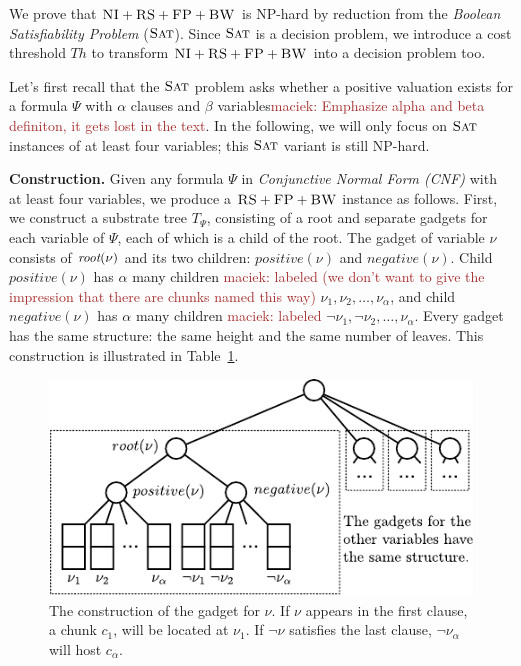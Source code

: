\documentclass[9pt]{sigcomm-alternate}
\newcommand{\maciek}[1]{\textcolor{brown}{maciek: #1}}
\newcommand{\variab}{\nu}
\newcommand{\aroot}{\emph{root}}
\newcommand{\clauses}{\alpha}
\newcommand{\variables}{\beta}
\newcommand{\achunk}{\ensuremath{c}}
\newcommand{\CC}{\textsc{NI}}
\newcommand{\FP}{\textsc{FP}}
\newcommand{\RS}{\textsc{RS}}
\newcommand{\BW}{\textsc{BW}}
\newcommand{\Tree}{\ensuremath{T}}
\newcommand{\SAT}{\textsc{Sat}}
\newcommand{\Formula}{\ensuremath{\Psi}}
\newcommand{\Thr}{\ensuremath{Th}}
\newcommand{\positive}{\ensuremath{positive}}
\newcommand{\negative}{\ensuremath{negative}}
\begin{document}
\begin{appendix}

We prove that $\CC+\RS+\FP+\BW$ is NP-hard by reduction from the \emph{Boolean Satisfiability Problem} ($\SAT$).
Since $\SAT$ is a decision
problem, we 
introduce a cost threshold $\Thr$ to transform $\CC+\RS+\FP+\BW$ into a decision problem too.

Let's first recall that the $\SAT$ problem asks whether a positive valuation exists
for a formula $\Formula$ with $\clauses$ clauses and $\variables$ variables\maciek{Emphasize alpha and beta definiton, it gets lost in the text}.
In the following, we will only focus on $\SAT$ instances of at least four variables;
this $\SAT$ variant is still NP-hard.

\textbf{Construction.}
Given any formula $\Formula$ in \emph{Conjunctive Normal Form (CNF)} with at least four variables, we produce
a $\RS+\FP+\BW$ instance as follows. First, we construct a substrate tree $\Tree_{\Formula}$, consisting of
a root and separate gadgets for each variable of $\Formula$, each of which
is a child of the root.
The gadget of variable $\variab$ consists of $\aroot(\variab)$ and its two children:
$\positive(\variab)$ and $\negative(\variab)$. Child $\positive(\variab)$ has $\clauses$
many children \maciek{labeled (we don't want to give the impression that there are chunks named this way)} $\nu_1, \nu_2, \ldots, \nu_{\clauses}$, and child
$\negative(\variab)$ has
$\clauses$ many children \maciek{labeled} $\neg \nu_1, \neg \nu_2, \dots, \nu_{\clauses}$. Every
gadget has the same structure: the same height and the same number of
leaves. This construction is illustrated in
Table~\ref{fig:construction_3sat}.


\begin{figure}
\includegraphics[width=\columnwidth]{figs/construction_3sat}
\caption{The construction of the gadget for $\nu$. If $\nu$ appears in the
first clause, a chunk $\achunk_1$, will be located at $\nu_1$. If $\neg \nu$
satisfies the last clause, $\neg
\nu_\alpha$ will host $\achunk_\alpha$.}
\label{fig:construction_3sat}
\end{figure}


\end{appendix}
\end{document}
